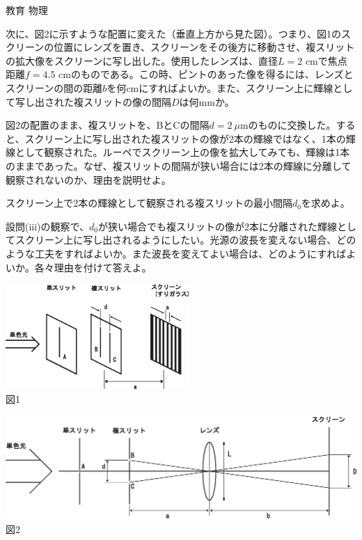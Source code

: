 \documentclass[fleqn]{jbook}
\begin{document}
\begin{question}{教育 物理}{}
\begin{subquestions}
\begin{subsubquestions}
\SubSubQuestion
次に、図2に示すような配置に変えた（垂直上方から見た図）。つまり、図1のスクリーンの位置にレンズを置き、スクリーンをその後方に移動させ、複スリットの拡大像をスクリーンに写し出した。使用したレンズは、直径$L=2$ cmで焦点距離$f=4.5$ cmのものである。この時、ピントのあった像を得るには、レンズとスクリーンの間の距離$b$を何cmにすればよいか。また、スクリーン上に輝線として写し出された複スリットの像の間隔$D$は何mmか。

\SubSubQuestion
図2の配置のまま、複スリットを、BとCの間隔$d=2\ \mu$mのものに交換した。すると、スクリーン上に写し出された複スリットの像が2本の輝線ではなく、1本の輝線として観察された。ルーペでスクリーン上の像を拡大してみても、輝線は1本のままであった。なぜ、複スリットの間隔が狭い場合には2本の輝線に分離して観察されないのか、理由を説明せよ。

\SubSubQuestion
スクリーン上で2本の輝線として観察される複スリットの最小間隔$d_0$を求めよ。

\SubSubQuestion
設問(iii)の観察で、$d_0$が狭い場合でも複スリットの像が2本に分離された輝線としてスクリーン上に写し出されるようにしたい。光源の波長を変えない場合、どのような工夫をすればよいか。また波長を変えてよい場合は、どのようにすればよいか。各々理由を付けて答えよ。\\

\begin{center}
\includegraphics[clip,width=7cm]{1999phys3-1.eps}\\
図1
\end{center}
\begin{center}
\includegraphics[clip,width=14cm]{1999phys3-2.eps}\\
図2
\end{center}

\end{subsubquestions}

\end{subquestions}

\end{question}
\end{document}
